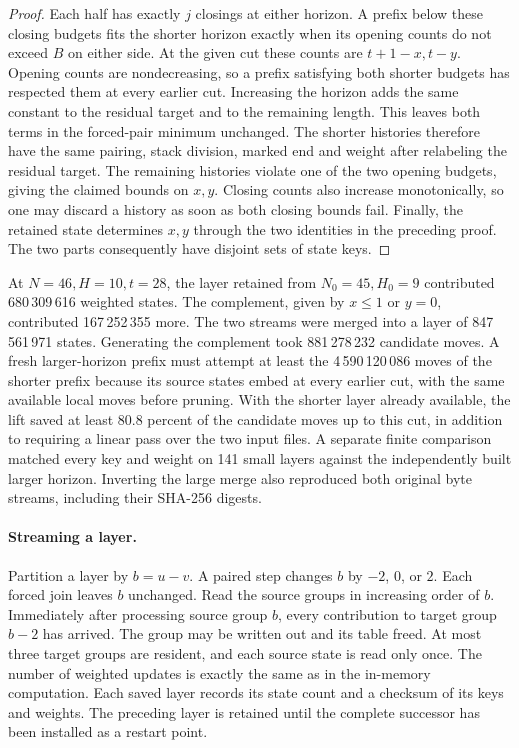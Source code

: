 \begin{proof}
Each half has exactly \(j\) closings at either horizon. A prefix below
these closing budgets fits the shorter horizon exactly when its opening
counts do not exceed \(B\) on either side. At the given cut these
counts are \(t+1-x,t-y\). Opening counts are nondecreasing, so a
prefix satisfying both shorter budgets has respected them at every
earlier cut. Increasing the horizon adds the same constant to the
residual target and to the remaining length. This leaves both terms in
the forced-pair minimum unchanged. The shorter histories therefore
have the same pairing, stack division, marked end and weight after
relabeling the residual target. The remaining histories violate one
of the two opening budgets, giving the claimed bounds on \(x,y\).
Closing counts also increase monotonically, so one may discard a
history as soon as both closing bounds fail. Finally, the retained
state determines \(x,y\) through the two identities in the preceding
proof. The two parts consequently have disjoint sets of state keys.
\end{proof}

At \(N=46,H=10,t=28\), the layer retained from \(N_0=45,H_0=9\)
contributed 680\,309\,616 weighted states. The complement, given by
\(x\le1\) or \(y=0\), contributed 167\,252\,355 more. The two streams
were merged into a layer of 847\,561\,971 states. Generating the
complement took 881\,278\,232 candidate moves. A fresh larger-horizon
prefix must attempt at least the 4\,590\,120\,086 moves of the shorter
prefix because its source states embed at every earlier cut, with the same
available local moves before pruning. With the shorter layer already
available, the lift saved at least 80.8 percent of the candidate moves
up to this cut, in addition to requiring a linear pass over the two
input files. A separate finite comparison matched every key and weight
on 141 small layers against the independently built larger horizon.
Inverting the large merge also reproduced both original byte streams,
including their SHA-256 digests.

\paragraph{Streaming a layer.}
Partition a layer by \(b=u-v\). A paired step changes \(b\) by
\(-2\), \(0\), or \(2\). Each forced join leaves \(b\) unchanged. Read the
source groups in increasing order of \(b\). Immediately after processing
source group \(b\), every contribution to target group \(b-2\) has
arrived. The group may be written out and its table freed. At most
three target groups are resident, and each source state is read only
once. The number of weighted updates is exactly the same as in the
in-memory computation. Each saved layer records its state count and
a checksum of its keys and weights. The preceding layer is retained
until the complete successor has been installed as a restart point.

